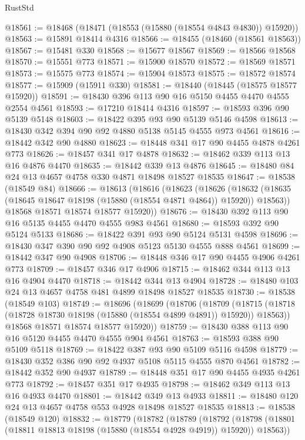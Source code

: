 \begin{lexlean}{RustStd}
\begin{coremodule}
@18561 := @18468 (@18471 (@18553 (@15880 (@18554 @4843 @4830)) @15920))
@18563 := @15891 @18414 @4316
@18566 := @18455 (@18460 (@18561 @18563))
@18567 := @15481 @330
@18568 := @15677 @18567
@18569 := @18566 @18568
@18570 := @15551 @773
@18571 := @15900 @18570
@18572 := @18569 @18571
@18573 := @15575 @773
@18574 := @15904 @18573
@18575 := @18572 @18574
@18577 := @15909 (@15911 @330)
@18581 := @18440 (@18445 (@18575 @18577 @15920))
@18591 := @18430 @396 @113 @90 @16 @5150 @4455 @4470 @4555 @2554 @4561
@18593 := @17210 @18414 @4316
@18597 := @18593 @396 @90 @5139 @5148
@18603 := @18422 @395 @93 @90 @5139 @5146 @4598
@18613 := @18430 @342 @394 @90 @92 @4880 @5138 @5145 @4555 @973 @4561
@18616 := @18442 @342 @90 @4880
@18623 := @18448 @341 @17 @90 @4455 @4878 @4261 @773
@18626 := @18457 @341 @17 @4878
@18632 := @18462 @339 @113 @13 @16 @4876 @4470
@18635 := @18442 @339 @13 @4876
@18645 := @18480 @84 @24 @13 @4657 @4758 @330 @4871 @18498 @18527 @18535
@18647 := @18538 (@18549 @84)
@18666 := @18613
    (@18616
      (@18623
        (@18626
          (@18632 (@18635 (@18645 @18647 @18198 (@15880 (@18554 @4871 @4864)) @15920)) @18563))
        @18568
        @18571
        @18574
        @18577
        @15920))
@18676 := @18430 @392 @113 @90 @16 @5135 @4455 @4470 @4555 @983 @4561
@18680 := @18593 @392 @90 @5124 @5133
@18686 := @18422 @391 @93 @90 @5124 @5131 @4598
@18696 := @18430 @347 @390 @90 @92 @4908 @5123 @5130 @4555 @888 @4561
@18699 := @18442 @347 @90 @4908
@18706 := @18448 @346 @17 @90 @4455 @4906 @4261 @773
@18709 := @18457 @346 @17 @4906
@18715 := @18462 @344 @113 @13 @16 @4904 @4470
@18718 := @18442 @344 @13 @4904
@18728 := @18480 @103 @24 @13 @4657 @4758 @481 @4899 @18498 @18527 @18535
@18730 := @18538 (@18549 @103)
@18749 := @18696
    (@18699
      (@18706
        (@18709
          (@18715 (@18718 (@18728 @18730 @18198 (@15880 (@18554 @4899 @4891)) @15920)) @18563))
        @18568
        @18571
        @18574
        @18577
        @15920))
@18759 := @18430 @388 @113 @90 @16 @5120 @4455 @4470 @4555 @904 @4561
@18763 := @18593 @388 @90 @5109 @5118
@18769 := @18422 @387 @93 @90 @5109 @5116 @4598
@18779 := @18430 @352 @386 @90 @92 @4937 @5108 @5115 @4555 @870 @4561
@18782 := @18442 @352 @90 @4937
@18789 := @18448 @351 @17 @90 @4455 @4935 @4261 @773
@18792 := @18457 @351 @17 @4935
@18798 := @18462 @349 @113 @13 @16 @4933 @4470
@18801 := @18442 @349 @13 @4933
@18811 := @18480 @120 @24 @13 @4657 @4758 @553 @4928 @18498 @18527 @18535
@18813 := @18538 (@18549 @120)
@18832 := @18779
    (@18782
      (@18789
        (@18792
          (@18798 (@18801 (@18811 @18813 @18198 (@15880 (@18554 @4928 @4919)) @15920)) @18563))

\end{coremodule}
\end{lexlean}
